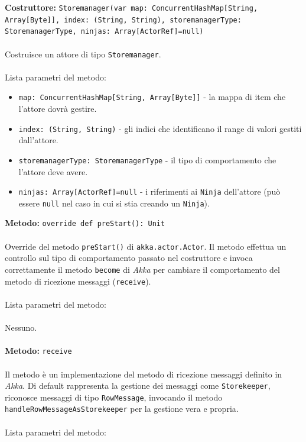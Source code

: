 \documentclass[a4paper]{article}
\begin{document}
		\textbf{Costruttore: }\texttt{Storemanager(var map: ConcurrentHashMap[String,  Array[Byte]], index: (String, String), storemanagerType: StoremanagerType, ninjas: Array[ActorRef]=null)}
			\\ \\
			Costruisce un attore di tipo \texttt{Storemanager}.
			\\ \\
			Lista parametri del metodo:
			\begin{itemize}
				\item \texttt{map: ConcurrentHashMap[String,  Array[Byte]]} - la mappa di item che l'attore dovrà gestire.
				\item \texttt{index: (String, String)} - gli indici che identificano il range di valori gestiti dall'attore.
				\item \texttt{storemanagerType: StoremanagerType} - il tipo di comportamento che l'attore deve avere.
				\item \texttt{ninjas: Array[ActorRef]=null} - i riferimenti ai \texttt{Ninja} dell'attore (può essere \texttt{null} nel caso in cui si stia creando un \texttt{Ninja}).
			\end{itemize}
		\textbf{Metodo: }\texttt{override def preStart(): Unit}
			\\ \\
			Override del metodo \texttt{preStart()} di \texttt{akka.actor.Actor}. Il metodo effettua un controllo sul tipo di comportamento passato nel costruttore e invoca correttamente il metodo \texttt{become} di \emph{Akka} per cambiare il comportamento del metodo di ricezione messaggi (\texttt{receive}).
			\\ \\
			Lista parametri del metodo:
			\\ \\
				Nessuno.
			\\ \\
		\textbf{Metodo: }\texttt{receive}
			\\ \\
			Il metodo è un implementazione del metodo di ricezione messaggi definito in \emph{Akka}. Di default rappresenta la gestione dei messaggi come \texttt{Storekeeper}, riconosce messaggi di tipo \texttt{RowMessage}, invocando il metodo \texttt{handleRowMessageAsStorekeeper} per la gestione vera e propria.
			\\ \\
			Lista parametri del metodo:
			\\ \\
\end{document}
